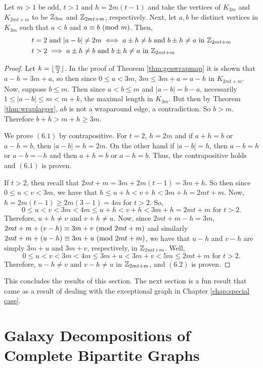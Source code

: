 \begin{corollary}\label{thm:gennewvertices}
    Let $m>1\text{ be odd},\,t>1\text{ and }h=2m(t-1)$ and take the vertices of $K_{3m}$ and $K_{2mt+m}$ to be $\mathbb{Z}_{3m}$ and $\mathbb{Z}_{2mt+m}$, respectively. Next, let $a,b$ be distinct vertices in $K_{3m}$ such that $a<b$ and $a\equiv b\ (\mathrm{mod}\ m)$. Then,
    \begin{align}
    &t=2\text{ and }|a-b|\neq 2m\iff a\pm h\neq b\text{ and }b\pm h \neq a\text{ in }\mathbb{Z}_{2mt+m}\\
    &t>2\implies a\pm h\neq b\text{ and }b\pm h \neq a\text{ in }\mathbb{Z}_{2mt+m}
    \end{align}
\end{corollary}
\begin{proof}
    Let $k=\lfloor\frac{m}{2}\rfloor$. In the proof of Theorem \ref{thm:genwrapmap} it is shown that $a-h=3m+a$, so then since $0\leq a<3m$, $3m\leq 3m+a=a-h$ in $K_{2mt+m}$. Now, suppose $b\leq m$. Then since $a<b\leq m$ and $|a-b|=b-a$, necessarily $1\leq |a-b|\leq m<m+k$, the maximal length in $K_{3m}$. But then by Theorem \ref{thm:wraplarger}, $ab$ is not a wraparound edge, a contradiction. So $b>m$. Therefore $b+h>m+h\geq 3m$.\newline

    \noindent We prove $(6.1)$ by contrapositive. For $t=2$, $h=2m$ and if $a+h = b$ or $a-h=b$, then $|a-b|=h=2m$. On the other hand if $|a-b|=h$, then $a-b=h$ or $a-b=-h$ and then $a+h = b$ or $a-h=b$. Thus, the contrapositive holds and $(6.1)$ is proven.\newline

    \noindent If $t>2$, then recall that $2mt+m=3m+2m(t-1)=3m+h$. So then since $0\leq u<v<3m$, we have that $h\leq u+h<v+h<3m+h=2mt+m$. Now, $h=2m(t-1)\geq 2m(3-1)=4m$ for $t>2$. So, $$0\leq u<v<3m<4m \leq u+h<v+h<3m+h=2mt+m\text{ for }t>2.$$ Therefore, $u+h\neq v$ and $v+ h\neq u$. Now, since $2mt+m-h=3m$, $2mt+m+(v-h)\equiv 3m+v\ (\mathrm{mod}\ 2mt+m)$ and similarly $2mt+m+(u-h)\equiv 3m+u\ (\mathrm{mod}\ 2mt+m)$, we have that $u-h$ and $v-h$ are simply $3m+u$ and $3m+v$, respectively, in $\mathbb{Z}_{2mt+m}$. Well, $$0\leq u<v<3m<4m\leq 3m+u<3m+v<5m\leq 2mt+m\text{ for }t>2.$$
    Therefore, $u-h\neq v$ and $v-h\neq u$ in $\mathbb{Z}_{2mt+m}$, and $(6.2)$ is proven.

\end{proof}
    This concludes the results of this section. The next section is a fun result that came as a result of dealing with the exceptional graph in Chapter \ref{chap:special case}.

\section{Galaxy Decompositions of Complete Bipartite Graphs}

